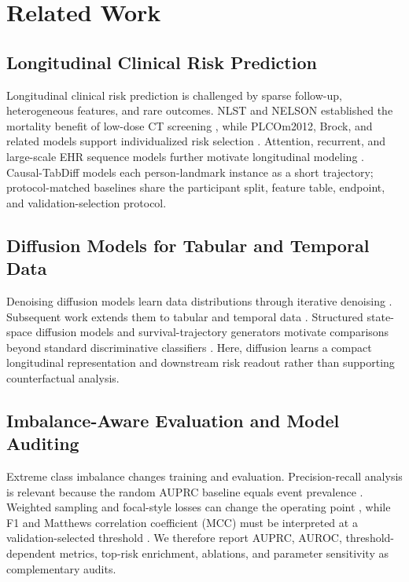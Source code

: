 \documentclass[11pt,journal,twoside]{IEEEtran}
\begin{document}
\section{Related Work}
\label{sec:related_work}

\subsection{Longitudinal Clinical Risk Prediction}
Longitudinal clinical risk prediction is challenged by sparse follow-up, heterogeneous features, and rare outcomes. NLST and NELSON established the mortality benefit of low-dose CT screening \cite{nlst2011,deKoning2020nelson}, while PLCOm2012, Brock, and related models support individualized risk selection \cite{bach2003risk,tammemagi2013,mcwilliams2013,kovalchik2013risk,katki2018models}. Attention, recurrent, and large-scale EHR sequence models further motivate longitudinal modeling \cite{choi2016retain,che2018grud,rajkomar2018ehr,lim2021tft}. Causal-TabDiff models each person-landmark instance as a short trajectory; protocol-matched baselines share the participant split, feature table, endpoint, and validation-selection protocol.

\subsection{Diffusion Models for Tabular and Temporal Data}
Denoising diffusion models learn data distributions through iterative denoising \cite{ho2020ddpm,nichol2021improved,song2021sde}. Subsequent work extends them to tabular and temporal data \cite{kotelnikov2023tabddpm,tashiro2021csdi,kollovieh2023tsdiff}. Structured state-space diffusion models and survival-trajectory generators motivate comparisons beyond standard discriminative classifiers \cite{lopez2023sssdeeg,konstantinov2024survtraj}. Here, diffusion learns a compact longitudinal representation and downstream risk readout rather than supporting counterfactual analysis.

\subsection{Imbalance-Aware Evaluation and Model Auditing}
Extreme class imbalance changes training and evaluation. Precision-recall analysis is relevant because the random AUPRC baseline equals event prevalence \cite{davis2006prroc,saito2015}. Weighted sampling and focal-style losses can change the operating point \cite{he2009imbalanced,lin2017focal}, while F1 and Matthews correlation coefficient (MCC) must be interpreted at a validation-selected threshold \cite{chicco2020mcc}. We therefore report AUPRC, AUROC, threshold-dependent metrics, top-risk enrichment, ablations, and parameter sensitivity as complementary audits.
\end{document}
